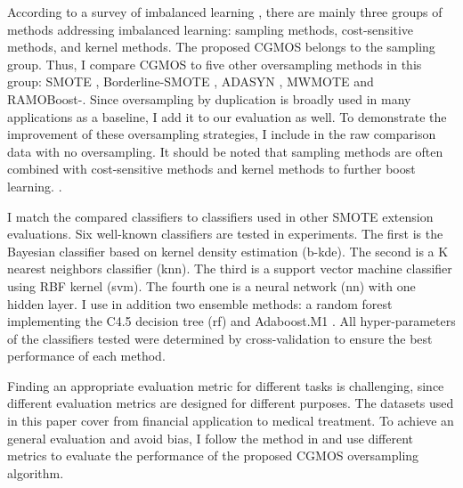 \documentclass{iitthesis}
\begin{document}
 According to a survey of imbalanced learning \cite{HH:09}, there are mainly three groups of methods addressing imbalanced learning: sampling methods, cost-sensitive methods, and kernel methods. The proposed CGMOS belongs to the sampling group. Thus, I compare CGMOS to five other oversampling methods in this group: SMOTE \cite{CNV:02}, Borderline-SMOTE \cite{HH:05}, ADASYN \cite{HH:08}, MWMOTE \cite{barua2014mwmote} and RAMOBoost-\cite{chen2010ramoboost}. Since oversampling by duplication is broadly used in many applications as a baseline, I add it to our evaluation as well. To demonstrate the improvement of these oversampling strategies, I include in the raw comparison data with no oversampling. It should be noted that sampling methods are often combined with cost-sensitive methods and kernel methods to further boost learning. \cite{chawla2004editorial}\cite{chawla2003smoteboost}\cite{guo2004learning}.

 I match the compared classifiers to classifiers used in other SMOTE extension evaluations. Six well-known classifiers are tested in experiments. The first is the Bayesian classifier based on kernel density estimation (b-kde). The second is a K nearest neighbors classifier (knn). The third is a support vector machine classifier using RBF kernel (svm). The fourth one is a neural network (nn) with one hidden layer. I use in addition two ensemble methods: a random forest implementing the C4.5 decision tree \cite{Quinlan:1993} (rf) and Adaboost.M1 \cite{fy:1996}. All hyper-parameters of the classifiers tested were determined by cross-validation to ensure the best performance of each method.

 Finding an appropriate evaluation metric for different tasks is challenging, since different evaluation metrics are designed for different purposes. The datasets used in this paper cover from financial application to medical treatment. To achieve an general evaluation and avoid bias, I follow the method in \cite{CNV:02}\cite{HH:05}\cite{HH:08}\cite{barua2014mwmote}\cite{chen2010ramoboost} and use different metrics to evaluate the performance of the proposed CGMOS oversampling algorithm.
\end{document}
